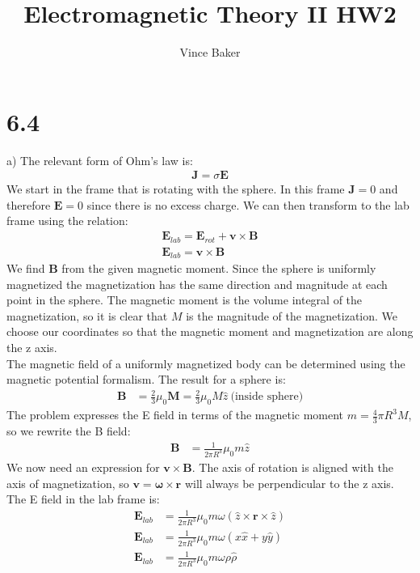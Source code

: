 \documentclass[a4paper,11pt]{article}
\title{Electromagnetic Theory II HW2}
\author{Vince Baker}
\numberwithin{equation}{section}
\newcommand{\bv}[1]{\mathbf{#1}}
\begin{document}
\maketitle

\section{6.4}
a) The relevant form of Ohm's law is:
\begin{align}
 \bv{J} = \sigma \bv{E}
\end{align}
We start in the frame that is rotating with the sphere.
In this frame $\bv{J}=0$ and therefore $\bv{E}=0$ since there is no excess charge. 
We can then transform to the lab frame using the relation:
\begin{align}
 \bv{E}_{lab} = \bv{E}_{rot}+\bv{v}\times \bv{B}\\
 \bv{E}_{lab} = \bv{v}\times \bv{B}
\end{align}
We find $\bv{B}$ from the given magnetic moment. 
Since the sphere is uniformly magnetized the magnetization has the same direction and magnitude at each point in the sphere.
The magnetic moment is the volume integral of the magnetization, so it is clear that $M$ is the magnitude of the magnetization.
We choose our coordinates so that the magnetic moment and magnetization are along the z axis.\\
The magnetic field of a uniformly magnetized body can be determined using the magnetic potential formalism.
The result for a sphere is:
\begin{align}
 \bv{B} &= \frac{2}{3}\mu_0 \bv{M} = \frac{2}{3}\mu_0M\hat{z}\ \text{(inside sphere)}
\end{align}
The problem expresses the E field in terms of the magnetic moment $m=\frac{4}{3}\pi R^3M$, so we rewrite the B field:
\begin{align}
 \bv{B} &= \frac{1}{2\pi R^3}\mu_0 m\hat{z}
\end{align}
We now need an expression for $\bv{v} \times \bv{B}$. 
The axis of rotation is aligned with the axis of magnetization, so $\bv{v} = \bv{\omega} \times \bv{r}$ will always be perpendicular to the z axis.
The E field in the lab frame is:
\begin{align}
 \bv{E}_{lab} &= \frac{1}{2\pi R^3}\mu_0 m \omega (\hat{z} \times \bv{r} \times \hat{z})\\
 \bv{E}_{lab} &= \frac{1}{2\pi R^3}\mu_0 m \omega (x\hat{x}+y\hat{y})\\
 \bv{E}_{lab} &= \frac{1}{2\pi R^3}\mu_0 m \omega \rho \hat{\rho}\\
\end{align}
\end{document}
